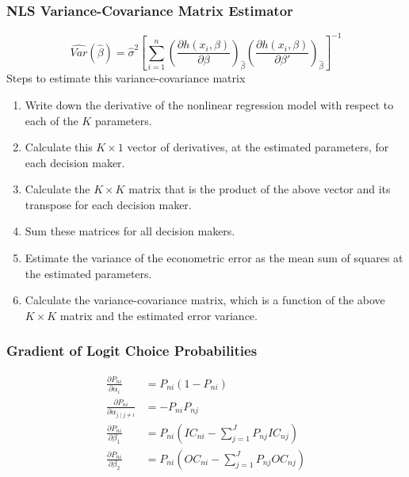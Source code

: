 \documentclass{beamer}\usepackage[]{graphicx}\usepackage[]{color}
\begin{document}
\begin{frame}\frametitle{NLS Variance-Covariance Matrix Estimator}
    $$\widehat{Var}(\hat{\beta}) = \hat{\sigma}^2 \left[ \sum_{i = 1}^n \left( \frac{\partial h(x_i, \beta)}{\partial \beta} \right)_{\hat{\beta}} \left( \frac{\partial h(x_i, \beta)}{\partial \beta'} \right)_{\hat{\beta}} \right]^{-1}$$
    Steps to estimate this variance-covariance matrix
    \begin{enumerate}
        \item Write down the derivative of the nonlinear regression model with respect to each of the $K$ parameters.
        \item Calculate this $K \times 1$ vector of derivatives, at the estimated parameters, for each decision maker.
        \item Calculate the $K \times K$ matrix that is the product of the above vector and its transpose for each decision maker.
        \item Sum these matrices for all decision makers.
        \item Estimate the variance of the econometric error as the mean sum of squares at the estimated parameters.
        \item Calculate the variance-covariance matrix, which is a function of the above $K \times K$ matrix and the estimated error variance.
    \end{enumerate}
\end{frame}

\begin{frame}\frametitle{Gradient of Logit Choice Probabilities}
    \begin{align*}
        \frac{\partial P_{ni}}{\partial \alpha_i} &= P_{ni} (1 - P_{ni}) \\
        \frac{\partial P_{ni}}{\partial \alpha_{j \mid j \neq i}} &= -P_{ni} P_{nj} \\
        \frac{\partial P_{ni}}{\partial \beta_1} &= P_{ni} (IC_{ni} - \sum_{j= 1}^J P_{nj} IC_{nj}) \\
        \frac{\partial P_{ni}}{\partial \beta_2} &= P_{ni} (OC_{ni} - \sum_{j= 1}^J P_{nj} OC_{nj})
    \end{align*}
\end{frame}
\end{document}
